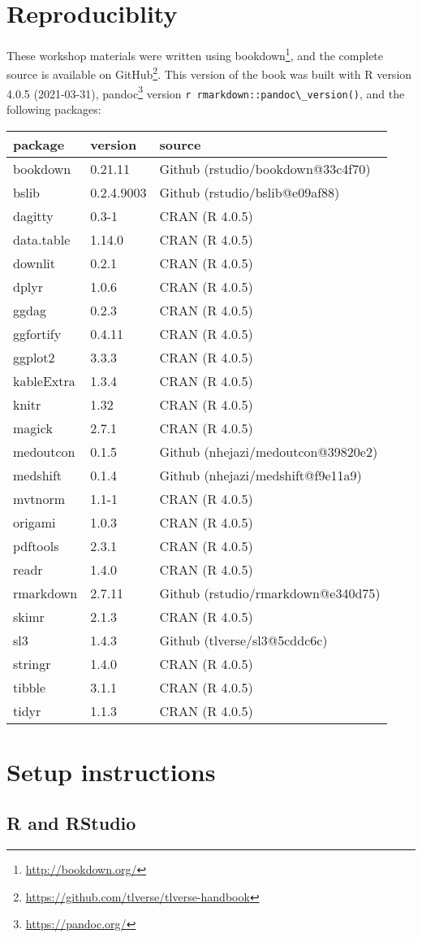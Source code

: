 \documentclass[
  12pt,
]{book}
\newcommand{\passthrough}[1]{#1}
\renewcommand{\href}[2]{#2\footnote{\url{#1}}}
\theoremstyle{definition}
\theoremstyle{definition}
\theoremstyle{definition}
\newcommand{\1}{\mathbbm{1}}
\begin{document}
\hypertarget{repro}{%
\section{Reproduciblity}\label{repro}}

These workshop materials were written using \href{http://bookdown.org/}{bookdown},
and the complete source is available on
\href{https://github.com/tlverse/tlverse-handbook}{GitHub}. This version of the book
was built with R version 4.0.5 (2021-03-31), \href{https://pandoc.org/}{pandoc} version \passthrough{\lstinline!r rmarkdown::pandoc\_version()!}, and the following packages:

\begin{longtable}[]{@{}lll@{}}
\toprule
package & version & source\tabularnewline
\midrule
\endhead
bookdown & 0.21.11 & Github (rstudio/bookdown@33c4f70)\tabularnewline
bslib & 0.2.4.9003 & Github (rstudio/bslib@e09af88)\tabularnewline
dagitty & 0.3-1 & CRAN (R 4.0.5)\tabularnewline
data.table & 1.14.0 & CRAN (R 4.0.5)\tabularnewline
downlit & 0.2.1 & CRAN (R 4.0.5)\tabularnewline
dplyr & 1.0.6 & CRAN (R 4.0.5)\tabularnewline
ggdag & 0.2.3 & CRAN (R 4.0.5)\tabularnewline
ggfortify & 0.4.11 & CRAN (R 4.0.5)\tabularnewline
ggplot2 & 3.3.3 & CRAN (R 4.0.5)\tabularnewline
kableExtra & 1.3.4 & CRAN (R 4.0.5)\tabularnewline
knitr & 1.32 & CRAN (R 4.0.5)\tabularnewline
magick & 2.7.1 & CRAN (R 4.0.5)\tabularnewline
medoutcon & 0.1.5 & Github (nhejazi/medoutcon@39820e2)\tabularnewline
medshift & 0.1.4 & Github (nhejazi/medshift@f9e11a9)\tabularnewline
mvtnorm & 1.1-1 & CRAN (R 4.0.5)\tabularnewline
origami & 1.0.3 & CRAN (R 4.0.5)\tabularnewline
pdftools & 2.3.1 & CRAN (R 4.0.5)\tabularnewline
readr & 1.4.0 & CRAN (R 4.0.5)\tabularnewline
rmarkdown & 2.7.11 & Github (rstudio/rmarkdown@e340d75)\tabularnewline
skimr & 2.1.3 & CRAN (R 4.0.5)\tabularnewline
sl3 & 1.4.3 & Github (tlverse/sl3@5cddc6c)\tabularnewline
stringr & 1.4.0 & CRAN (R 4.0.5)\tabularnewline
tibble & 3.1.1 & CRAN (R 4.0.5)\tabularnewline
tidyr & 1.1.3 & CRAN (R 4.0.5)\tabularnewline
\bottomrule
\end{longtable}

\hypertarget{setup}{%
\section{Setup instructions}\label{setup}}

\hypertarget{r-and-rstudio}{%
\subsection{R and RStudio}\label{r-and-rstudio}}
\end{document}
